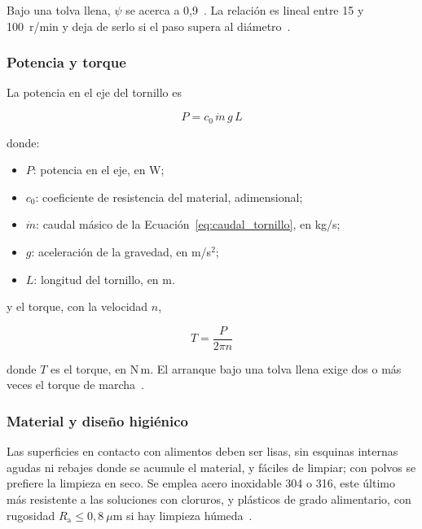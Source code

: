 Bajo una tolva llena, $\psi$ se acerca a 0,9~\parencite{karwat2021screw}. La
relación es lineal entre 15 y 100~r/min y deja de serlo si el paso supera al
diámetro~\parencite{bates2000screw}.

\subsubsection{Potencia y torque}
\label{subsubsec:fund_potencia_tornillo}

La potencia en el eje del tornillo es~\parencite{karwat2021screw}

\begin{equation}
    P = c_{0}\, \dot{m}\, g\, L
    \label{eq:potencia_tornillo}
\end{equation}

\noindent donde:

\begin{itemize}[nosep, label={}, leftmargin=1.5em]
    \item $P$: potencia en el eje, en W;
    \item $c_{0}$: coeficiente de resistencia del material, adimensional;
    \item $\dot{m}$: caudal másico de la Ecuación~\eqref{eq:caudal_tornillo}, en kg/s;
    \item $g$: aceleración de la gravedad, en m/s$^{2}$;
    \item $L$: longitud del tornillo, en m.
\end{itemize}

\noindent y el torque, con la velocidad $n$,

\begin{equation}
    T = \frac{P}{2\pi n}
    \label{eq:torque_tornillo}
\end{equation}

\noindent donde $T$ es el torque, en N\,m. El arranque bajo una tolva llena
exige dos o más veces el torque de marcha~\parencite{bates2000screw}.

\subsubsection{Material y diseño higiénico}
\label{subsubsec:fund_higienico}

Las superficies en contacto con alimentos deben ser lisas, sin esquinas internas
agudas ni rebajes donde se acumule el material, y fáciles de limpiar; con polvos
se prefiere la limpieza en seco. Se emplea acero inoxidable 304 o 316, este último
más resistente a las soluciones con cloruros, y plásticos de grado alimentario,
con rugosidad $R_{\mathrm{a}} \le 0{,}8~\mu$m si hay limpieza
húmeda~\parencite{mager2016hygienic}.

